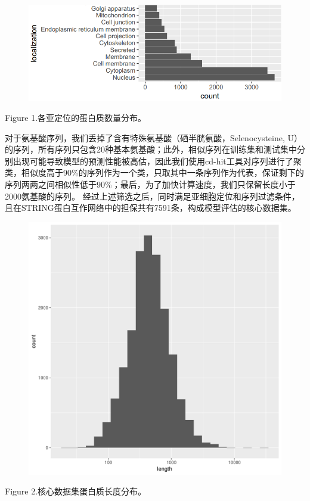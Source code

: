 \documentclass[a4paper,UTF8]{article}
\begin{document}
\begin{figure}[H]
	\centering\includegraphics[scale=0.7]{../data/summary/loc.png}
\end{figure}
Figure 1.各亚定位的蛋白质数量分布。

对于氨基酸序列，我们丢掉了含有特殊氨基酸（硒半胱氨酸，Selenocysteine, U）的序列，所有序列只包含20种基本氨基酸；此外，相似序列在训练集和测试集中分别出现可能导致模型的预测性能被高估，因此我们使用cd-hit工具对序列进行了聚类，相似度高于90\%的序列作为一个类，只取其中一条序列作为代表，保证剩下的序列两两之间相似性低于90\%；最后，为了加快计算速度，我们只保留长度小于2000氨基酸的序列。
经过上述筛选之后，同时满足亚细胞定位和序列过滤条件，且在STRING蛋白互作网络中的担保共有7591条，构成模型评估的核心数据集。

\begin{figure}[H]
	\centering\includegraphics[scale=0.5]{../data/summary/seqlen.pdf}
\end{figure}
Figure 2.核心数据集蛋白质长度分布。
\end{document}
